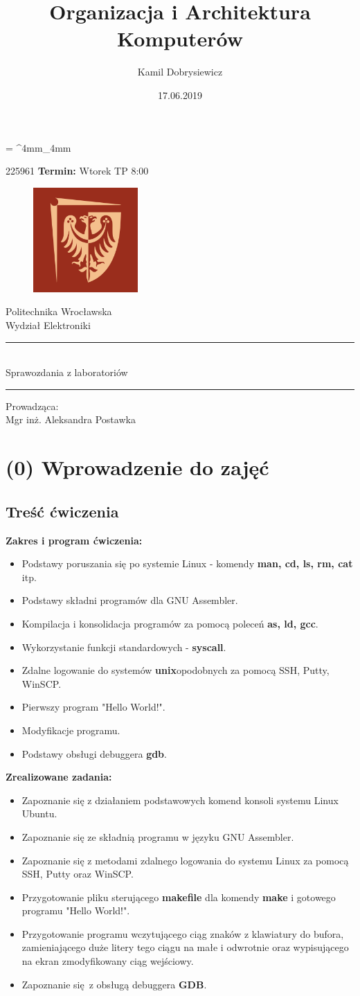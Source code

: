 \documentclass[a4paper,12pt]{article}
\makeatletter
\newcommand{\linia}{\rule{\linewidth}{0.4mm}}
\renewcommand{\maketitle}{\begin{titlepage}		
		
		\begin{flushleft}\large
			\@author \hspace{0.5cm} 225961 \hspace{\stretch{1}}
			\textbf{Termin: } Wtorek TP 8:00\\
		\end{flushleft}
		
		\vspace{1.5cm}
		
		\begin{center}
			\begin{figure}[h]
				\centering\includegraphics[width=4cm]{Materialy/PWR}
				\label{fig:PWR}
			\end{figure}
		\end{center}	
		\centering\Huge Politechnika Wrocławska\\
		\centering\LARGE Wydział Elektroniki\\
		
		\vspace{2.5cm}
		
		\noindent\linia
		\begin{center}	
			\LARGE \textsc{\@title}\\
			\vspace{0.3cm}
			\Large Sprawozdania z laboratoriów
		\end{center}
		\linia
		
		\begin{center}
			\vspace{3cm}	
			\large Prowadząca:\\
			\Large Mgr inż. Aleksandra Postawka
		\end{center}
		
		\vspace*{\stretch{6}}
		
		\begin{center}		
			\large \@date
		\end{center}
		
	\end{titlepage}%
	
}
\makeatother
\begin{document}
	
	\tabulinesep = ^4mm_4mm
	\everyrow{\tabucline[.4mm  white]{}}
	
	\title{Organizacja i Architektura Komputerów}
	\author{Kamil Dobrysiewicz}
	\date{17.06.2019}
	\maketitle
	
\newpage
	
	
\tableofcontents
\newpage
	
\section{(0) Wprowadzenie do zajęć}
\subsection{Treść ćwiczenia}
\textbf{Zakres i program ćwiczenia:}
\begin{itemize}
	\item Podstawy poruszania się po systemie Linux - komendy \textbf{man, cd, ls, rm, cat} itp.
	\item Podstawy składni programów dla GNU Assembler.
	\item Kompilacja  i konsolidacja programów za pomocą poleceń \textbf{as, ld, gcc}.
	\item Wykorzystanie funkcji standardowych - \textbf{syscall}.
	\item Zdalne logowanie do systemów \textbf{unix}opodobnych za pomocą SSH, Putty, WinSCP.
	\item Pierwszy program "Hello World!".
	\item Modyfikacje programu.
	\item Podstawy obsługi debuggera \textbf{gdb}.
\end{itemize}
\textbf{Zrealizowane zadania:}
\begin{itemize}
	\item Zapoznanie się z działaniem podstawowych komend konsoli systemu Linux Ubuntu.
	\item Zapoznanie się ze składnią programu w języku GNU Assembler.
	\item Zapoznanie się z metodami zdalnego logowania do systemu Linux za pomocą SSH, Putty oraz WinSCP.
	\item Przygotowanie pliku sterującego \textbf{makefile} dla komendy \textbf{make} i gotowego programu "Hello World!".
	\item Przygotowanie programu wczytującego ciąg znaków z klawiatury do bufora, zamieniającego duże litery tego ciągu na małe i odwrotnie oraz wypisującego na ekran zmodyfikowany ciąg wejściowy.
	\item Zapoznanie się z obsługą debuggera \textbf{GDB}. 	
\end{itemize}
\end{document}
